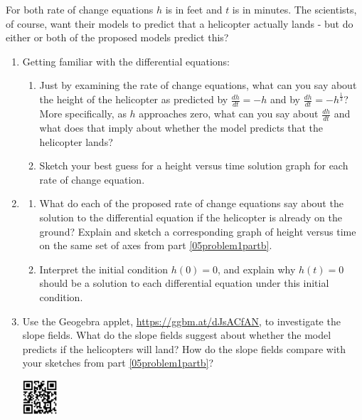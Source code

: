 For both rate of change equations $h$ is in feet and $t$ is in minutes. The scientists, of course, want their models to predict that a helicopter actually lands - but do either or both of the proposed models predict this? 
\begin{enumerate}
\item Getting familiar with the differential equations: \label{05problem1}

\begin{enumerate}
\item Just by examining the rate of change equations, what can you say about the height of the helicopter as predicted by $\displaystyle\frac{dh}{dt}=-h$  and by $\displaystyle\frac{dh}{dt}=-h^{\frac{1}{3}}$? More specifically, as $h$ approaches zero, what can you say about $\displaystyle\frac{dh}{dt}$ and what does that imply about whether the model predicts that the helicopter lands? \label{05problem1parta}
\vfill

\item Sketch your best guess for a height versus time solution graph for each rate of change equation. \label{05problem1partb}
\end{enumerate}
\vfill

\item	\label{05problem2}
\begin{enumerate}
\item What do each of the proposed rate of change equations say about the solution to the differential equation if the helicopter is already on the ground? Explain and sketch a corresponding graph of height versus time on the same set of axes from part \ref{05problem1partb}. \label{05problem2parta}
\vfill

\item Interpret the initial condition $h(0) = 0$, and explain why $h(t) = 0$ should be a solution to each differential equation under this initial condition. \label{05problem2partb}
\vfill
\end{enumerate}

\clearpage

\item Use the Geogebra applet, \href{https://ggbm.at/dJsACfAN}{\underline{https://ggbm.at/dJsACfAN}}, to investigate the slope fields. What do the slope fields suggest about whether the model predicts if the helicopters will land?  How do the slope fields compare with your sketches from part \ref{05problem1partb}? \label{05problem3}

\vspace{-.05in}\hspace{-.5in}\includegraphics[width=0.5in]{05/05ProposedPathsQR.png}
\vfill


\end{enumerate}
